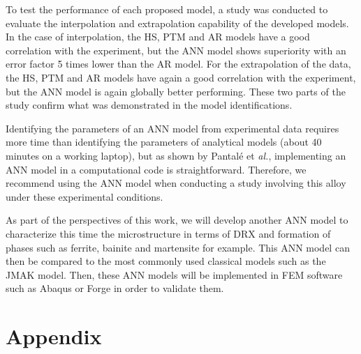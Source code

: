 \documentclass[twoside,english,1p,final,sort&compress]{elsarticle}
\makeatletter
\theoremstyle{plain}
\DeclareRobustCommand{\eal}{et \emph{al.}\@\xspace}
\makeatother
\begin{document}
To test the performance of each proposed model, a study was conducted to evaluate the interpolation and extrapolation capability of the developed models.
In the case of interpolation, the HS, PTM and AR models have a good correlation with the experiment, but the ANN model shows superiority with an error factor 5 times lower than the AR model.
For the extrapolation of the data, the HS, PTM and AR models have again a good correlation with the experiment, but the ANN model is again globally better performing.
These two parts of the study confirm what was demonstrated in the model identifications.

Identifying the parameters of an ANN model from experimental data requires more time than identifying the parameters of analytical models (about 40 minutes on a working laptop), but as shown by Pantalé \eal \cite{Pantale-2021}, implementing an ANN model in a computational code is straightforward.
Therefore, we recommend using the ANN model when conducting a study involving this alloy under these experimental conditions.

As part of the perspectives of this work, we will develop another ANN model to characterize this time the microstructure in terms of DRX and formation of phases such as ferrite, bainite and martensite for example.
This ANN model can then be compared to the most commonly used classical models such as the JMAK model.
Then, these ANN models will be implemented in FEM software such as Abaqus or Forge in order to validate them.




\section*{Appendix\label{sec:Appendix}}
\end{document}
